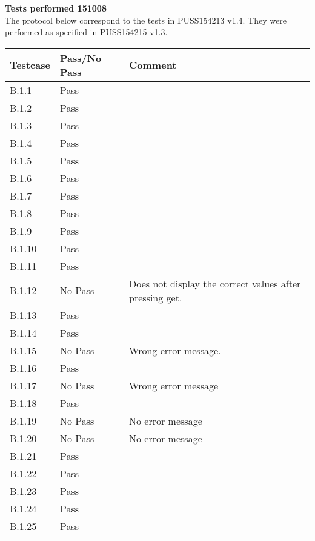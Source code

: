 \renewcommand{\testdate}{151008}
\textbf{ Tests performed \testdate} \\
The protocol below correspond to the tests in PUSS154213 v1.4. They were performed as specified in PUSS154215 v1.3.
\begin{center}
  		\begin{tabular}{| p{3cm} | p{5cm} | p{5cm} |}
    		\hline
	    	\textbf{Testcase}			& \textbf{Pass/No Pass} 	& \textbf{Comment} \\ \hline
    		B.1.1		 						& Pass 										&  				\\ \hline
    		B.1.2		 						& Pass 										& 				 \\	\hline
    		B.1.3		 						& Pass 										& 				 \\	\hline
    		B.1.4		 						& Pass 										& 				 \\	\hline
    		B.1.5		 						& Pass 										& 				 \\	\hline
    		B.1.6		 						& Pass 										& 				 \\	\hline
    		B.1.7		 						& Pass 										& 				 \\	\hline
    		B.1.8		 						& Pass 										& 				 \\	\hline
    		B.1.9		 						& Pass 										& 				 \\	\hline
    		B.1.10	 							& Pass 										& 				 \\	\hline
    		B.1.11	 							& Pass 										& 				 \\	\hline
    		B.1.12	 							& No Pass 										& Does not display the correct values after pressing get.				 \\	\hline
    		B.1.13	 							& Pass 										& 				 \\	\hline
    		B.1.14	 							& Pass 										& 				 \\	\hline
    		B.1.15	 							& No Pass 										& Wrong error message.				 \\	\hline
    		B.1.16	 							& Pass 										& 				 \\	\hline
    		B.1.17	 							& No Pass								& Wrong error message				 \\	\hline
    		B.1.18	 							& Pass 										& 				 \\	\hline
    		B.1.19	 							& No Pass 										& No error message				 \\	\hline
    		B.1.20	 							& No Pass 										& No error message \\ \hline
    		B.1.21	 							& Pass 										& \\ \hline
    		B.1.22	 							& Pass										&  \\ \hline
    		B.1.23	 							& Pass											&  \\ \hline
    		B.1.24	 							& Pass											&  \\ \hline
    		B.1.25	 							& Pass											&  \\ \hline
 		 \end{tabular}
	\end{center}